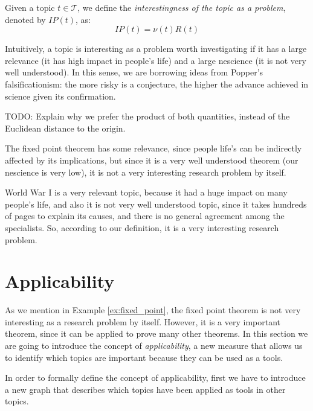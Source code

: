\begin{definition}
Given a topic $t \in \mathcal{T}$, we define the \emph{interestingness of the topic as a problem}, denoted by $IP(t)$, as:
\[
IP(t) = \nu(t) R(t)
\]
\end{definition}

Intuitively, a topic is interesting as a problem worth investigating if it has a large relevance (it has high impact in people's life) and a large nescience (it is not very well understood). In this sense, we are borrowing ideas from Popper's falsificationism: the more risky is a conjecture, the higher the advance achieved in science given its confirmation.

{\color{red} TODO: Explain why we prefer the product of both quantities, instead of the Euclidean distance to the origin.}

\begin{example}
\label{ex:fixed_point}
The fixed point theorem has some relevance, since people life's can be indirectly affected by its implications, but since it is a very well understood theorem (our nescience is very low), it is not a very interesting research problem by itself.

World War I is a very relevant topic, because it had a huge impact on many people's life, and also it is not very well understood topic, since it takes hundreds of pages to explain its causes, and there is no general agreement among the specialists. So, according to our definition, it is a very interesting research problem.
\end{example}

%
%

\section{Applicability}

As we mention in Example \ref{ex:fixed_point}, the fixed point theorem is not very interesting as a research problem by itself. However, it is a very important theorem, since it can be applied to prove many other theorems. In this section we are going to introduce the concept of \emph{applicability}, a new measure that allows us to identify which topics are important because they can be used as a tools.

In order to formally define the concept of applicability, first we have to introduce a new graph that describes which topics have been applied as tools in other topics.

